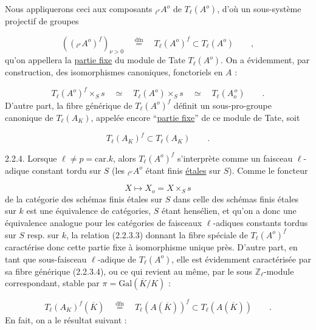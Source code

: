 Nous appliquerons ceci aux composants ${}_{\ell^{\nu}}A^{o}$ de $T_{\ell}(A^{o})$, d'où un sous-système projectif de groupes

\begin{equation}\tag{2.2.3.2}
(({}_{\ell^{\nu}}A^{o})^{f})_{\nu > 0} \quad \stackrel{\mathrm{dfn}}{=} \quad T_{\ell}(A^{o})^{f} \subset T_{\ell}(A^{o}) \qquad ,
\end{equation}
qu'on appellera la \underline{partie fixe} du module de Tate $T_{\ell}(A^{o})$. On a évidemment, par construction, des isomorphismes canoniques, fonctoriels en $A$ :

\begin{equation}\tag{2.2.3.3}
T_{\ell}(A^{o})^{f} \times_{S} s \quad \simeq \quad T_{\ell}(A^{o}) \times_{S} s \quad \simeq \quad T_{\ell}(A_{o}^{\,o}) \qquad .
\end{equation}
D'autre part, la fibre générique de $T_{\ell}(A^{o})^{f}$ définit un sous-pro-groupe canonique de $T_{\ell}(A_{K})$, appelée encore ``\underline{partie fixe}'' de ce module de Tate, soit

\begin{equation}\tag{2.2.3.4}
T_{\ell}(A_{K})^{f} \subset T_{\ell}(A_{K}) \qquad .
\end{equation}


2.2.4. Lorsque $\ell \neq p = \mathrm{car}.k$, alors $T_{\ell}(A^{o})^{f}$ s'interprète comme un faisceau $\ell$-adique constant tordu sur $S$ (les ${}_{\ell^{\nu}}A^{o}$ étant finis \underline{étales} sur $S$). Comme le foncteur

\begin{equation*}
X \longmapsto X_{o} = X \times_{S} s
\end{equation*}
de la catégorie des schémas finis étales sur $S$ dans celle des schémas finis étales sur $k$ est une équivalence de catégories, $S$ étant hensélien, et qu'on a donc une équivalence analogue pour les catégories de faisceaux $\ell$-adiques constants tordus sur $S$ resp. sur $k$, la relation (2.2.3.3) donnant la fibre spéciale de $T_{\ell}(A^{o})^{f}$ caractérise donc cette partie fixe à isomorphisme unique près. D'autre part, en tant que sous-faisceau $\ell$-adique de $T_{\ell}(A^{o})$, elle est évidemment caractérisée par sa fibre générique (2.2.3.4), ou ce qui revient au même, par le sous $\mathbb{Z}_{\ell}$-module correspondant, stable par $\pi = \mathrm{Gal}(\overline{K}/K)$ :

\begin{equation}\tag{2.2.4.1}
T_{\ell}(A_{K})^{f}(\overline{K}) \quad \stackrel{\mathrm{dfn}}{=} \quad T_{\ell}(A(\overline{K}))^{f} \subset T_{\ell}(A(\overline{K})) \qquad .
\end{equation}
En fait, on a le résultat suivant :

